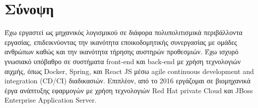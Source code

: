 \documentclass[letterpaper]{style/twentysecondcv} %
\begin{document}







\makeprofile %


\section{Σύνοψη}

Έχω εργαστεί ως μηχανικός λογισμικού σε διάφορα πολυπολιτισμικά περιβάλλοντα εργασίας, επιδεικνύοντας την ικανότητα εποικοδομητικής συνεργασίας με ομάδες ανθρώπων καθώς και την ικανότητα τήρησης αυστηρών προθεσμιών.
Έχω ισχυρό γνωσιακό υπόβαθρο σε συστήματα front-end και back-end με χρήση τεχνολογιών αιχμής, όπως Docker, Spring, και React JS μέσω agile continuous development and integration (CD/CI) διαδικασιών.
Επιπλέον, από το 2016 εργάζομαι σε βιομηχανικά έργα ανάπτυξης εφαρμογών με χρήση τεχνολογιών Red Hat private Cloud και JBoss Enterprise Application Server.
\end{document}

